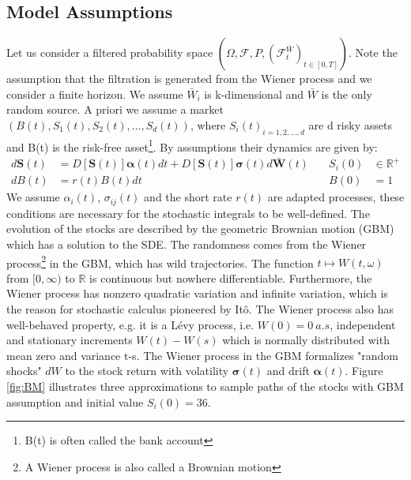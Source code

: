 \subsection{Model Assumptions}
Let us consider a filtered probability space $(\Omega, \mathcal{F}, P, (\mathcal{F}_t^{\bar{W}})_{t \in [0,T]})$. Note the assumption that the filtration is generated from the Wiener process and we consider a finite horizon. We assume $\bar{W}_i$ is k-dimensional and $\bar{W}$ is the only random source. A priori we assume a market $(B(t),S_1(t), S_2(t),\ldots, S_d(t))$, where ${S_i(t)}_{i=1,2,\ldots,d}$ are d risky assets and B(t) is the risk-free asset\footnote{B(t) is often called the bank account}. By assumptions their dynamics are given by:\\
\begin{align}
d\bm{S}(t)&=D[\bm{S}(t)]\bm{\alpha}(t)dt+D[\bm{S}(t)]\bm{\sigma}(t)d\bar{\bm{W}}(t) \quad & S_i(0) &\in \mathbb{R}^+ \label{GBM-P} \\
dB(t)&=r(t)B(t)dt \quad & B(0) &= 1
\end{align}
We assume $\alpha_i(t)$, $\sigma_{ij}(t)$ and the short rate $r(t)$ are adapted processes, these conditions are necessary for the stochastic integrals to be well-defined. The evolution of the stocks are described by the geometric Brownian motion (GBM) which has a solution to the SDE. The randomness comes from the Wiener process\footnote{A Wiener process is also called a Brownian motion} in the GBM, which has wild trajectories. The function $t\mapsto W(t,\omega)$ from $[0,\infty)$ to $\mathbb{R}$ is continuous but nowhere differentiable. Furthermore, the Wiener process has nonzero quadratic variation and infinite variation, which is the reason for stochastic calculus pioneered by Itô. The Wiener process also has well-behaved property, e.g. it is a Lévy process, i.e. $W(0)=0 \ a.s$, independent and stationary increments $W(t)-W(s)$ which is normally distributed with mean zero and variance t-s. The Wiener process in the GBM formalizes "random shocks" $dW$ to the stock return with volatility $\bm{\sigma}(t)$ and drift $\bm{\alpha}(t)$. Figure \ref{fig:BM} illustrates three approximations to sample paths of the stocks with GBM assumption and initial value $S_{i}(0)=36$.\\

